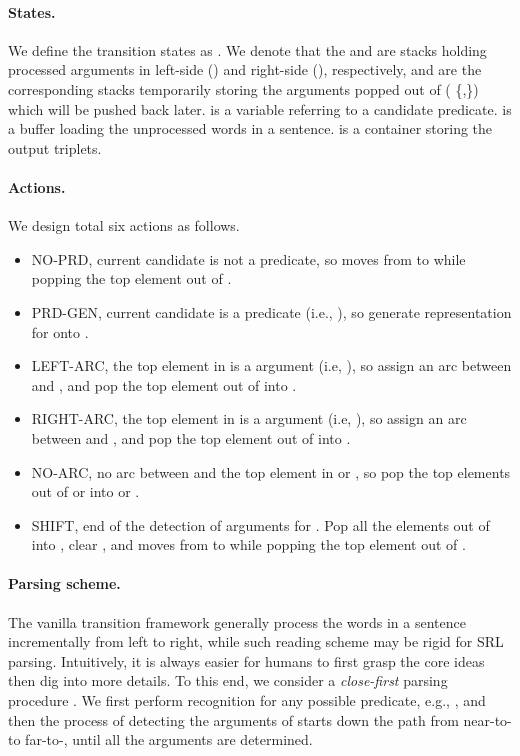 \documentclass[letterpaper]{article} \usepackage{aaai21}  \usepackage{times}  \usepackage{helvet} \usepackage{courier}  \usepackage[hyphens]{url}  \usepackage{graphicx} \urlstyle{rm} \def\UrlFont{\rm}  \usepackage{natbib}  \usepackage{caption}
\begin{document}
\begin{CJK}{UTF8}{gbsn}
\paragraph{States.}
We define the transition states as .
We denote that the  and  are stacks holding processed arguments in left-side () and right-side (), respectively,
 and  are the corresponding stacks temporarily storing the arguments popped out of  (  \{,\}) which will be pushed back later.
 is a variable referring to a candidate predicate.
 is a buffer loading the unprocessed words in a sentence.
 is a container storing the output triplets.


\paragraph{Actions.}

We design total six actions as follows.
\begin{itemize}
\setlength{\topsep}{0pt}
\setlength{\itemsep}{0pt}
\setlength{\parsep}{0pt}
\setlength{\parskip}{0pt}
    \item NO-PRD, current candidate  is not a predicate, so moves  from  to  while popping the top element out of .


    \item PRD-GEN, current candidate  is a predicate (i.e., ), so generate representation for  onto .


    \item LEFT-ARC, the top element in  is a argument (i.e, ), so assign an arc between  and , and pop the top element out of  into .

    \item RIGHT-ARC, the top element in  is a argument (i.e, ), so assign an arc between  and , and pop the top element out of  into .


    \item NO-ARC, no arc between  and the top element in  or , so pop the top elements out of  or  into  or .


    \item SHIFT, end of the detection of arguments for . Pop all the elements out of  into , clear , and moves  from  to  while popping the top element out of .

\end{itemize}


\vspace{-10pt}
\paragraph{Parsing scheme.}
The vanilla transition framework generally process the words in a sentence incrementally from left to right, while such reading scheme may be rigid for SRL parsing.
Intuitively, it is always easier for humans to first grasp the core ideas then dig into more details.
To this end, we consider a \emph{close-first} parsing procedure \cite{goldberg-elhadad-2010-efficient,cai-lam-2019-core,kurita-sogaard-2019-multi}.
We first perform recognition for any possible predicate, e.g., , and then the process of detecting the arguments of  starts down the path from near-to- to far-to-, until all the arguments are determined.




\end{CJK}
\end{document}
